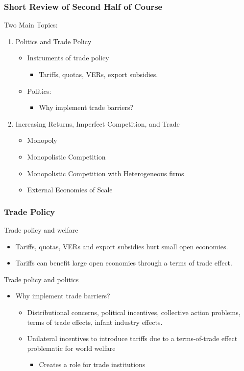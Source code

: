 \documentclass{beamer}
\begin{document}
\begin{frame}
	\frametitle{Short Review of Second Half of Course}
Two Main Topics:
\begin{enumerate}
	\item Politics and Trade Policy
		\begin{itemize}
			\item Instruments of trade policy
				\begin{itemize}
					\item Tariffs, quotas, VERs, export subsidies.
				\end{itemize}
			\item Politics:
					\begin{itemize}
								\item Why implement trade barriers?
					\end{itemize}
			\end{itemize}
	\item Increasing Returns, Imperfect Competition, and Trade
		\begin{itemize}
			\item Monopoly
			\item Monopolistic Competition
			\item Monopolistic Competition with Heterogeneous firms
			\item External Economies of Scale
		\end{itemize}
\end{enumerate}

\end{frame}

\begin{frame}
	\frametitle{Trade Policy}

Trade policy and welfare
\begin{itemize}
	\item Tariffs, quotas, VERs and export subsidies hurt small open economies.
	\item Tariffs can benefit large open economies through a terms of trade effect.
\end{itemize}
Trade policy and politics
\begin{itemize}
	\item Why implement trade barriers?
		\begin{itemize}
			\item Distributional concerns, political incentives, collective action problems, terms of trade effects, infant industry effects. 
			\item Unilateral incentives to introduce tariffs due to a terms-of-trade effect problematic for world welfare
				\begin{itemize}
					\item Creates a role for trade institutions
				\end{itemize}
		\end{itemize}
\end{itemize}
\end{frame}
\end{document}
